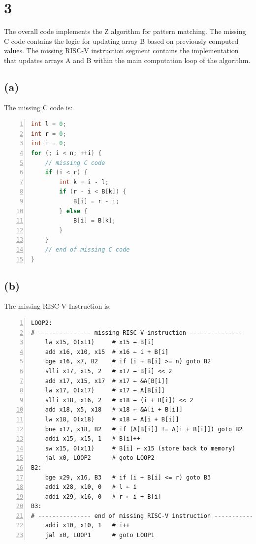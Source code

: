 \documentclass[12pt]{article}
\begin{document}
\section*{3}
The overall code implements the Z algorithm for pattern matching. The missing C code contains the logic for updating array B based on previously computed values. The missing RISC-V instruction segment contains the implementation that updates arrays A and B within the main computation loop of the algorithm.

\subsection*{(a)}

The missing C code is:
\begin{lstlisting}[language=C++, basicstyle=\ttfamily\small, keywordstyle=\color{blue}\bfseries, commentstyle=\color{gray}\itshape, stringstyle=\color{red}, numbers=left, numberstyle=\tiny\color{gray}, stepnumber=1, frame=single]
int l = 0;
int r = 0;
int i = 0;
for (; i < n; ++i) {
    // missing C code
    if (i < r) {
        int k = i - l;
        if (r - i < B[k]) {
            B[i] = r - i;
        } else {
            B[i] = B[k];
        }
    }
    // end of missing C code
}
\end{lstlisting}

\subsection*{(b)}

The missing RISC-V Instruction is:
\begin{lstlisting}[basicstyle=\ttfamily\small, numbers=left, numberstyle=\tiny\color{gray}, stepnumber=1, frame=single]
LOOP2:
# --------------- missing RISC-V instruction ---------------
    lw x15, 0(x11)     # x15 ← B[i]
    add x16, x10, x15  # x16 ← i + B[i]
    bge x16, x7, B2    # if (i + B[i] >= n) goto B2
    slli x17, x15, 2   # x17 ← B[i] << 2
    add x17, x15, x17  # x17 ← &A[B[i]]
    lw x17, 0(x17)     # x17 ← A[B[i]]
    slli x18, x16, 2   # x18 ← (i + B[i]) << 2
    add x18, x5, x18   # x18 ← &A[i + B[i]]
    lw x18, 0(x18)     # x18 ← A[i + B[i]]
    bne x17, x18, B2   # if (A[B[i]] != A[i + B[i]]) goto B2
    addi x15, x15, 1   # B[i]++
    sw x15, 0(x11)     # B[i] ← x15 (store back to memory)
    jal x0, LOOP2      # goto LOOP2
B2:
    bge x29, x16, B3   # if (i + B[i] <= r) goto B3
    addi x28, x10, 0   # l ← i
    addi x29, x16, 0   # r ← i + B[i]
B3:
# --------------- end of missing RISC-V instruction ---------------
    addi x10, x10, 1   # i++
    jal x0, LOOP1      # goto LOOP1
\end{lstlisting}
\end{document}
